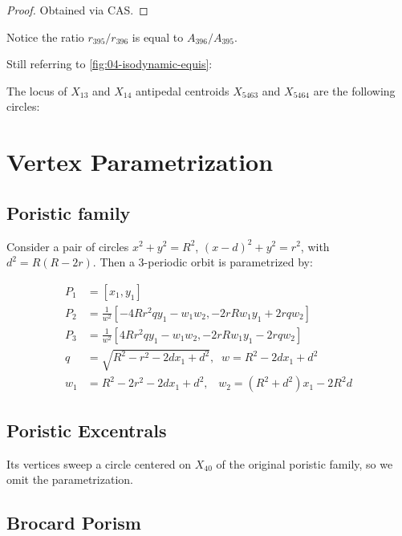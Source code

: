 \begin{proof}
Obtained via CAS.
\end{proof}

\begin{remark}
Notice the ratio $r_{395}/r_{396}$ is equal to $A_{396}/A_{395}$.
\end{remark}

Still referring to \cref{fig:04-isodynamic-equis}:

\begin{proposition}
The locus of $X_{13}$ and $X_{14}$ antipedal centroids $X_{5463}$ and $X_{5464}$ are the following circles:
\end{proposition}


\section{Vertex Parametrization}

\subsection{Poristic family}
\label{sec:04-vtx-poristic}

Consider a pair of circles $x^2+y^2=R^2$,
$(x-d)^2+y^2=r^2$, with $d^2=R(R-2r)$. Then a 3-periodic orbit is parametrized by:

\begin{align}
P_1&=[x_1,y_1]\nonumber \\
 P_2&=\frac{1}{w^2} [ -4R r^2 q  y_1 - w_1w_2 , -2r R w_1y_1 + 2 r q w_2 ]\nonumber \\
  P_3 &=  \frac{1}{w^2} [4R r^2 q  y_1 - w_1w_2 , -2r R w_1y_1 - 2 r q w_2 ]\label{eq:04-vtx-poristic} \\
  q&=\sqrt{R^2 - r^2 - 2d x_1  + d^2},\;\; w=R^2 - 2d x_1  + d^2\nonumber 
  \\ w_1&=R^2 - 2r^2 - 2 d x_1 + d^2,\;\;\;
  w_2=(R^2+d^2) x_1 - 2 R^2 d  \nonumber
\end{align}

\subsection{Poristic Excentrals}

Its vertices sweep a circle centered on $X_{40}$ of the original poristic family, so we omit the parametrization.

\subsection{Brocard Porism}
\label{sec:04-broc-porism}


